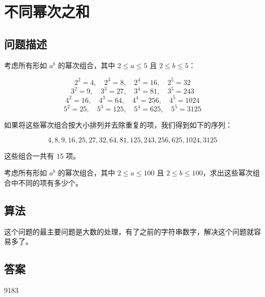\section{不同幂次之和}\label{sec:problem29}
\subsection{问题描述}
\begin{tcolorbox}
考虑所有形如 \( a^b \) 的幂次组合，其中 \( 2 \leq a \leq 5 \) 且 \( 2 \leq b \leq 5 \)：

\[
2^2 = 4, \quad 2^3 = 8, \quad 2^4 = 16, \quad 2^5 = 32
\]
\[
3^2 = 9, \quad 3^3 = 27, \quad 3^4 = 81, \quad 3^5 = 243
\]
\[
4^2 = 16, \quad 4^3 = 64, \quad 4^4 = 256, \quad 4^5 = 1024
\]
\[
5^2 = 25, \quad 5^3 = 125, \quad 5^4 = 625, \quad 5^5 = 3125
\]

如果将这些幂次组合按大小排列并去除重复的项，我们得到如下的序列：

\[
4, 8, 9, 16, 25, 27, 32, 64, 81, 125, 243, 256, 625, 1024, 3125
\]

这些组合一共有 15 项。

考虑所有形如 \( a^b \) 的幂次组合，其中 \( 2 \leq a \leq 100 \) 且 \( 2 \leq b \leq 100 \)，求出这些幂次组合中不同的项有多少个。

\end{tcolorbox}

\subsection{算法}
这个问题的最主要问题是大数的处理，有了之前的字符串数字，解决这个问题就容易多了。

\subsection{答案}
9183
